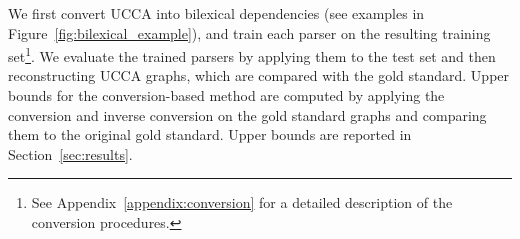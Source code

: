 \documentclass[11pt,a4paper]{article}
\newcommand{\secref}[1]{Section~\ref{#1}}
\newcommand{\figref}[1]{Figure~\ref{#1}}
\begin{document}
We first convert UCCA into bilexical dependencies
(see examples in \figref{fig:bilexical_example}), and train each parser on the resulting
training set\footnote{See Appendix~\ref{appendix:conversion} for a detailed description of
the conversion procedures.}.
We evaluate the trained parsers by applying them to the test set
and then reconstructing UCCA graphs, which are compared with the gold standard.
Upper bounds for the conversion-based method are computed by applying
the conversion and inverse conversion on the gold standard
graphs and comparing them to the original gold standard.
Upper bounds are reported in \secref{sec:results}.

\end{document}
